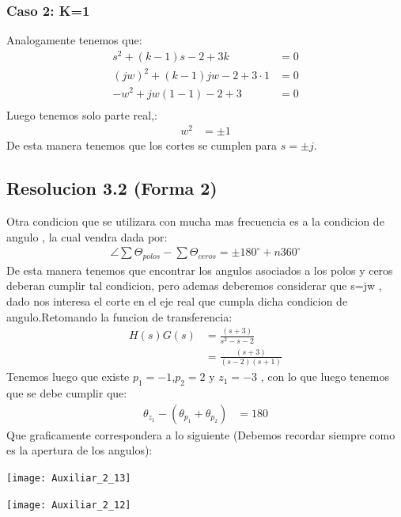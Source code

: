 \documentclass[
  11pt,
  letterpaper,
   addpoints,
   answers
  ]{exam}
\begin{document}
\begin{questions}
\begin{solution}
\subsubsection*{Caso 2: K=1}
Analogamente tenemos que:
\begin{align}
    s^{2}+(k-1)s-2+3k &= 0\\
    (jw)^{2}+(k-1)jw-2+3\cdot 1 &= 0\\
    -w^{2}+jw(1-1) -2+3 &= 0\\
\end{align}
Luego tenemos solo parte real,:
\begin{align}
    w^{2} &= \pm 1
\end{align}
De esta manera tenemos que los cortes se cumplen para $s= \pm j$.
\subsection*{Resolucion 3.2 (Forma 2)} 
Otra condicion que se utilizara con mucha mas frecuencia es a la condicion de angulo , la cual vendra dada por:
\begin{align}
    \angle \sum \Theta_{polos} - \sum \Theta_{ceros} = \pm 180^{\circ} + n360^{\circ} 
\end{align}
De esta manera tenemos que encontrar los angulos asociados a los polos y ceros deberan cumplir tal condicion, pero ademas deberemos considerar que s=jw , dado nos interesa el corte en el eje real que cumpla dicha condicion de angulo.Retomando la funcion de transferencia:
\begin{align}
    H(s)G(s) &= \frac{(s+3)}{s^{2}-s-2}\\
             &= \frac{(s+3)}{(s-2)(s+1)}
\end{align}
Tenemos luego que existe $p_{1}=-1$,$p_{2}=2$ y $z_{1}=-3$ , con lo que luego tenemos que se debe cumplir que:
\begin{align}
    \theta_{z_{1}} - (\theta_{p_{1}} + \theta_{p_{2}}) &= 180
\end{align}
Que graficamente correspondera a lo siguiente (Debemos recordar siempre como es la apertura de los angulos):
\begin{center}
    \texttt{[image: Auxiliar\_2\_13]}
  \end{center}
  \begin{center}
    \texttt{[image: Auxiliar\_2\_12]}
  \end{center}

\end{solution}
\end{questions}
\end{document}
